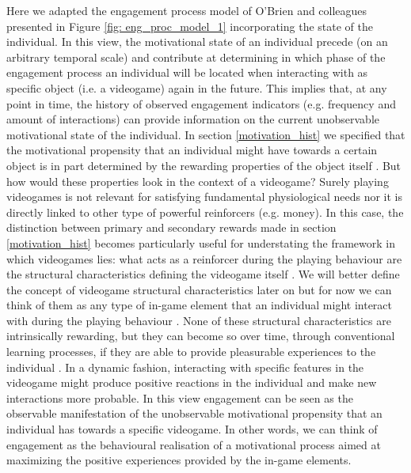 Here we adapted the engagement process model of O'Brien and colleagues \cite{o2008user} presented in Figure \ref{fig: eng_proc_model_1} incorporating the state of the individual. In this view, the motivational state of an individual precede (on an arbitrary temporal scale) and contribute at determining in which phase of the engagement process an individual will be located when interacting with as specific object (i.e. a videogame) again in the future. This implies that, at any point in time, the history of observed engagement indicators (e.g. frequency and amount of interactions) can provide information on the current unobservable motivational state of the individual. In section \ref{motivation_hist} we specified that the motivational propensity that an individual might have towards a certain object is in part determined by the rewarding properties of the object itself \cite{berridge2004motivation}. But how would these properties look in the context of a videogame? Surely playing videogames is not relevant for satisfying fundamental physiological needs nor it is directly linked to other type of powerful reinforcers (e.g. money). In this case, the distinction between primary and secondary rewards made in section \ref{motivation_hist} becomes particularly useful for understating the framework in which videogames lies: what acts as a reinforcer during the playing behaviour are the structural characteristics defining the videogame itself \cite{king2010role, king2010video, yannakakis2013player}. We will better define the concept of videogame structural characteristics later on but for now we can think of them as any type of in-game element that an individual might interact with during the playing behaviour \cite{king2010role,king2010video}. None of these structural characteristics are intrinsically rewarding, but they can become so over time, through conventional learning processes, if they are able to provide pleasurable experiences to the individual \cite{skinner1953science, berridge2004motivation, przybylski2010motivational}. In a dynamic fashion, interacting with specific features in the videogame might produce positive reactions in the individual and make new interactions more probable. In this view engagement can be seen as the observable manifestation of the unobservable motivational propensity that an individual has towards a specific videogame. In other words, we can think of engagement as the behavioural realisation of a motivational process aimed at maximizing the positive experiences provided by the in-game elements. 

